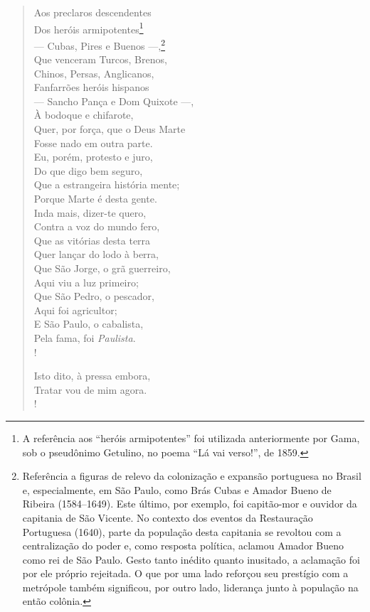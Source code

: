 \begin{verse}
Aos preclaros descendentes\\
Dos heróis armipotentes\footnote{A referência aos ``heróis
  armipotentes'' foi utilizada anteriormente por Gama, sob o pseudônimo
  Getulino, no poema ``Lá vai verso!'', de 1859.}\\
--- Cubas, Pires e Buenos ---,\footnote{ Referência a figuras de relevo
  da colonização e expansão portuguesa no Brasil e, especialmente, em
  São Paulo, como Brás Cubas e Amador Bueno de Ribeira (1584--1649). Este
  último, por exemplo, foi capitão-mor e ouvidor da capitania de São
  Vicente. No contexto dos eventos da Restauração Portuguesa (1640),
  parte da população desta capitania se revoltou com a centralização do
  poder e, como resposta política, aclamou Amador Bueno como rei de São
  Paulo. Gesto tanto inédito quanto inusitado, a aclamação foi por ele
  próprio rejeitada. O que por uma lado reforçou seu prestígio com a
  metrópole também significou, por outro lado, liderança junto à
  população na então colônia.}\\
Que venceram Turcos, Brenos,\\
Chinos, Persas, Anglicanos,\\
Fanfarrões heróis hispanos\\
--- Sancho Pança e Dom Quixote ---,\\
À bodoque e chifarote,\\
Quer, por força, que o Deus Marte\\
Fosse nado em outra parte.\\
Eu, porém, protesto e juro,\\
Do que digo bem seguro,\\
Que a estrangeira história mente;\\
Porque Marte é desta gente.\\
Inda mais, dizer-te quero,\\
Contra a voz do mundo fero,\\
Que as vitórias desta terra\\
Quer lançar do lodo à berra,\\
Que São Jorge, o grã guerreiro,\\
Aqui viu a luz primeiro;\\
Que São Pedro, o pescador,\\
Aqui foi agricultor;\\
E São Paulo, o cabalista,\\
Pela fama, foi \emph{Paulista}.\\!

Isto dito, à pressa embora,\\
Tratar vou de mim agora.\\!


\end{verse}

